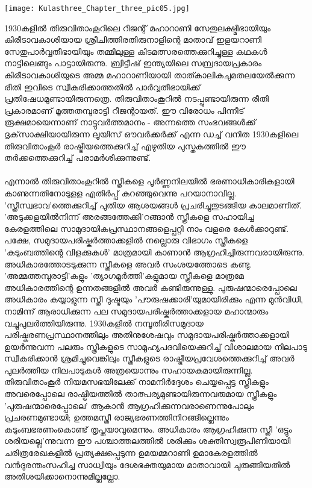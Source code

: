 \label{ch3box3} %
\begin{tcolorbox}[%
 breakable, %
  arc=0mm, 
  left=1pt, right = 1pt, 
  boxrule=0mm,
  colback = {blue!10}, %
] 

\begin{center}
\texttt{[image: Kulasthree\_Chapter\_three\_pic05.jpg]}
\end{center}

1930കളിൽ തിരുവിതാംകൂറിലെ റീജന്റ് മഹാറാണി സേതുലക്ഷ്മീഭായിയും കിരീടാവകാശിയായ ശ്രീചിത്തിരതിരുനാളിന്റെ മാതാവ് ഇളയറാണി സേതുപാർവ്വതീഭായിയും തമ്മിലുള്ള കിടമത്സരത്തെക്കുറിച്ചുള്ള കഥകൾ നാട്ടിലെങ്ങും പാട്ടായിരുന്നു. ബ്രിട്ടീഷ് ഇന്ത്യയിലെ സമ്പ്രദായപ്രകാരം കിരീടാവകാശിയുടെ അമ്മ മഹാറാണിയായി താത്കാലികചുമതലയേൽക്കുന്ന രീതി ഇവിടെ സ്വീകരിക്കാത്തതിൽ പാർവ്വതീഭായിക്ക് പ്രതിഷേധമുണ്ടായിരുന്നത്രെ. തിരുവിതാംകൂറിൽ നടപ്പുണ്ടായിരുന്ന രീതി പ്രകാരമാണ് മൂത്തതമ്പുരാട്ടി റീജന്റായത്. ഈ വിരോധം പിന്നീട് രൂക്ഷമായെന്നാണ് നാട്ടുവർത്തമാനം - അന്നത്തെ സംഭവങ്ങൾക്ക് ദൃക്‌സാക്ഷിയായിരുന്ന ലൂയിസ് ഔവർക്കർക്ക് എന്ന ഡച്ച് വനിത 1930കളിലെ തിരുവിതാംകൂർ രാഷ്ട്രീയത്തെക്കുറിച്ച് എഴുതിയ പുസ്തകത്തിൽ ഈ തർക്കത്തെക്കുറിച്ച് പരാമർശിക്കുന്നുണ്ട്.

\end{tcolorbox}

\paragraph{}
എന്നാൽ തിരുവിതാംകൂറിൽ സ്ത്രീകളെ പൂർണ്ണനിലയിൽ ഭരണാധികാരികളായി കാണുന്നതിനോടുളള എതിർപ്പ് കുറഞ്ഞുവെന്നു പറയാനാവില്ല. 'സ്ത്രീസ്വഭാവ'ത്തെക്കുറിച്ച് പുതിയ ആശയങ്ങൾ പ്രചരിച്ചുതുടങ്ങിയ കാലമാണിത്. 'അടുക്കളയിൽനിന്ന് അരങ്ങത്തേക്കി'റങ്ങാൻ സ്ത്രീകളെ സഹായിച്ച കേരളത്തിലെ സാമുദായികപ്രസ്ഥാനങ്ങളെപ്പറ്റി നാം വളരെ കേൾക്കാറുണ്ട്. പക്ഷേ, സമുദായപരിഷ്കർത്താക്കളിൽ നല്ലൊരു വിഭാഗം സ്ത്രീകളെ 'കുടുംബത്തിന്റെ വിളക്കുകൾ' മാത്രമായി കാണാൻ ആഗ്രഹിച്ചിരുന്നവരായിരുന്നു. അധികാരത്തോടടുക്കുന്ന സ്ത്രീകളെ അവർ സംശയത്തോടെ കണ്ടു. 'അമ്മത്തമ്പുരാട്ടി'കളും 'ത്യാഗമൂർത്തി'കളുമായ സ്ത്രീകളെ മാത്രമേ അധികാരത്തിന്റെ ഉന്നതങ്ങളിൽ അവർ കണ്ടിരുന്നുള്ളു. പുരുഷന്മാരെപ്പോലെ അധികാരം കയ്യാളുന്ന സ്ത്രീ ദുഷ്ടയും 'പൗരുഷക്കാരി'യുമായിരിക്കും എന്ന മുൻവിധി, നാമിന്ന് ആരാധിക്കുന്ന പല സമുദായപരിഷ്കർത്താക്കളായ മഹാന്മാരും വച്ചുപുലർത്തിയിരുന്നു. 1930കളിൽ നമ്പൂതിരിസമുദായ പരിഷ്കരണപ്രസ്ഥാനത്തിലും അതിനുശേഷവും സമുദായപരിഷ്കർത്താക്കളായി ഉയർന്നുവന്ന പലരും സ്ത്രീകളുടെ സാമൂഹ്യപദവിയെക്കുറിച്ച് വിശാലമായ നിലപാടു സ്വീകരിക്കാൻ ശ്രമിച്ചുവെങ്കിലും സ്ത്രീകളുടെ രാഷ്ട്രീയപ്രവേശത്തെക്കുറിച്ച് അവർ പുലർത്തിയ നിലപാടുകൾ അത്രയൊന്നും സഹായകമായിരുന്നില്ല. തിരുവിതാംകൂർ നിയമസഭയിലേക്ക് നാമനിർദ്ദേശം ചെയ്യപ്പെട്ട സ്ത്രീകളും അവരെപ്പോലെ രാഷ്ട്രീയത്തിൽ താത്പര്യമുണ്ടായിരുന്നവരുമായ സ്ത്രീകളും 'പുരുഷന്മാരെപ്പോലെ' ആകാൻ ആഗ്രഹിക്കുന്നവരാണെന്നുപോലും പ്രചരണമുണ്ടായി; ഉത്തമസ്ത്രീ രാജ്യഭരണത്തിനിറങ്ങില്ലെന്നും കുടുംബഭരണംകൊണ്ട് തൃപ്തയാവുമെന്നും. അധികാരം ആഗ്രഹിക്കുന്ന സ്ത്രീ 'ഒട്ടും ശരിയല്ലെ'ന്നുവന്ന ഈ പശ്ചാത്തലത്തിൽ ശരിക്കും ശക്തിസ്വരൂപിണിയായി ചരിത്രരേഖകളിൽ പ്രത്യക്ഷപ്പെടുന്ന ഉമയമ്മറാണി ഉമാകേരളത്തിൽ വൻദുരന്തംസഹിച്ച സാധ്വിയും ദേശഭക്തയുമായ മാതാവായി ചുരുങ്ങിയതിൽ അതിശയിക്കാനൊന്നുമില്ലല്ലോ.


